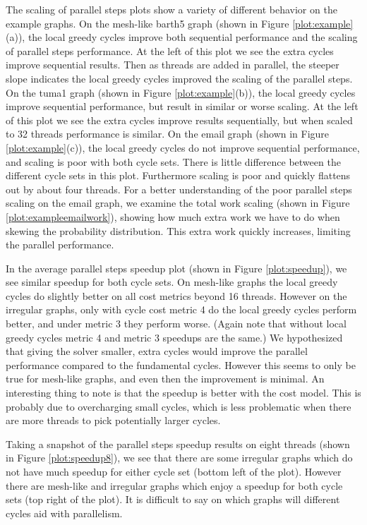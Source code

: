 \documentclass{sig-alternate}
\begin{document}
The scaling of parallel steps plots show
a variety of different behavior on the example graphs.
On the mesh-like barth5 graph
(shown in Figure \ref{plot:example}(a)),
the local greedy cycles improve both sequential
performance and the scaling of parallel steps performance.
At the left of this plot we see the extra cycles improve sequential results.
Then as threads are added in parallel, the steeper
slope indicates the local greedy cycles improved
the scaling of the parallel steps.
On the tuma1 graph
(shown in Figure \ref{plot:example}(b)),
the local greedy cycles improve sequential performance,
but result in similar or worse scaling.
At the left of this plot we see the extra cycles improve results
sequentially, but when scaled to 32 threads performance is similar.
On the email graph
(shown in Figure \ref{plot:example}(c)),
the local greedy cycles do not improve
sequential performance, and scaling is poor with both cycle sets.
There is little difference between the different cycle sets in this
plot. Furthermore scaling is poor and quickly flattens out by about
four threads.
For a better understanding of the poor parallel steps
scaling on the email graph, we examine the total work scaling
(shown in Figure \ref{plot:exampleemailwork}), showing how much extra
work we have to do when skewing the probability distribution.
This extra work quickly increases, limiting the parallel performance.

In the average parallel steps
speedup plot (shown in Figure \ref{plot:speedup}), we see
similar speedup for both cycle sets. On mesh-like graphs the local greedy
cycles do slightly better on all cost metrics beyond 16 threads. However
on the irregular graphs, only with cycle cost metric 4 do the local greedy
cycles perform better, and under metric 3 they perform worse. (Again note
that without local greedy cycles metric 4 and metric 3 speedups are the same.)
We hypothesized that giving the solver smaller, extra cycles
would improve the parallel
performance compared to the fundamental cycles.
However this seems to only be true for mesh-like graphs,
and even then the improvement is minimal.
An interesting thing to note is that the speedup
is better with the  cost model. This is probably due to overcharging
small cycles, which is less problematic when there
are more threads to pick potentially
larger cycles.

Taking a snapshot of the parallel steps speedup results on eight threads
(shown in Figure \ref{plot:speedup8}),
we see that there are some irregular
graphs which do not have much speedup for either cycle set
(bottom left of the plot).
However there are mesh-like and irregular graphs
which enjoy a speedup for both cycle sets (top right
of the plot).
It is difficult to say on which graphs will different
cycles aid with parallelism.
\end{document}
